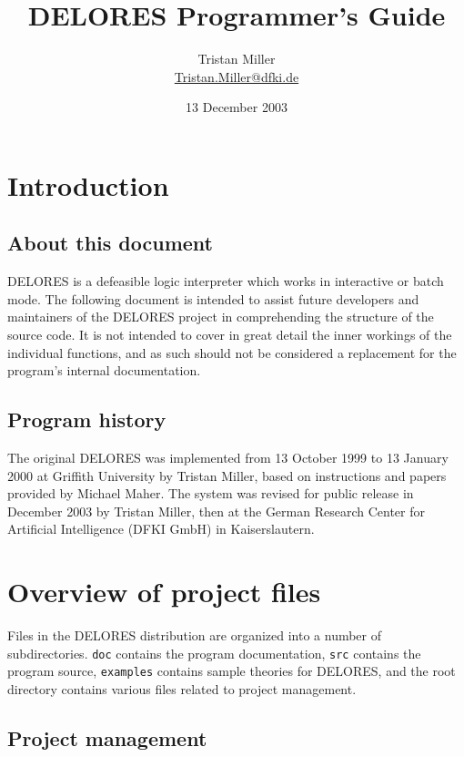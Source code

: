 \documentclass[a4paper,10pt,twocolumn]{article}
\begin{document}
\title{DELORES Programmer's Guide}
\author{Tristan Miller\\
\url{Tristan.Miller@dfki.de}}
\date{13 December 2003}
\maketitle
\tableofcontents

\section{Introduction}
\subsection{About this document}

DELORES is a defeasible logic interpreter which works in interactive
or batch mode. The following document is intended to assist future
developers and maintainers of the DELORES project in comprehending the
structure of the source code. It is not intended to cover in great
detail the inner workings of the individual functions, and as such
should not be considered a replacement for the program's internal
documentation.

\subsection{Program history}

The original DELORES was implemented from 13 October 1999 to 13
January 2000 at Griffith University by Tristan Miller, based on
instructions and papers provided by Michael Maher. The system was
revised for public release in December 2003 by Tristan Miller, then at
the German Research Center for Artificial Intelligence (DFKI GmbH) in
Kaisers\-lautern.

\section{Overview of project files}

Files in the DELORES distribution are organized into a number of
subdirectories.  \texttt{doc} contains the program documentation,
\texttt{src} contains the program source, \texttt{examples} contains
sample theories for DELORES, and the root directory contains various
files related to project management.

\subsection{Project management}
\end{document}
